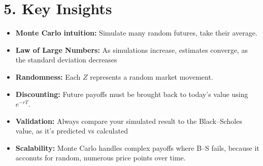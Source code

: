 \documentclass[12pt]{article}
\begin{document}
\section{5. Key Insights}

\begin{itemize}
    \item \textbf{Monte Carlo intuition:} Simulate many random futures, take their average.
    \item \textbf{Law of Large Numbers:} As simulations increase, estimates converge, as the standard deviation decreases
    \item \textbf{Randomness:} Each $Z$ represents a random market movement.
    \item \textbf{Discounting:} Future payoffs must be brought back to today's value using $e^{-rT}$.
    \item \textbf{Validation:} Always compare your simulated result to the Black--Scholes value, as it's predicted vs calculated
    \item \textbf{Scalability:} Monte Carlo handles complex payoffs where B--S fails, because it acconuts for random, numerous price points over time.
\end{itemize}
\end{document}
